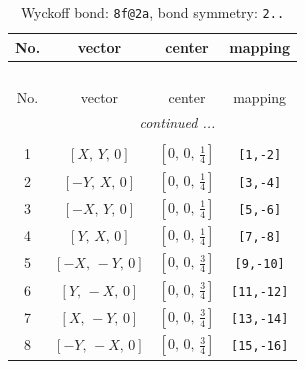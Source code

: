 \documentclass[fleqn,8pt]{jsarticle}
\begin{document}
\begin{longtable}{cccc}
\caption{Wyckoff bond: {\tt 8f@2a}, bond symmetry: {\tt 2..}}
 \\
 \hline \hline
No. & vector & center & mapping \\ \hline \endfirsthead

\multicolumn{3}{l}{\tablename\ \thetable{}} \\
 \hline \hline
No. & vector & center & mapping \\ \hline \endhead

 \hline \hline
\multicolumn{3}{r}{\footnotesize\it continued ...} \\ \endfoot

 \hline \hline
\multicolumn{3}{r}{} \\ \endlastfoot

1 & $\left[ X,\, Y,\, 0 \right]$ & $\left[ 0,\, 0,\, \frac{1}{4} \right]$ & {\tt [1,-2]} \\ \hline
2 & $\left[ - Y,\, X,\, 0 \right]$ & $\left[ 0,\, 0,\, \frac{1}{4} \right]$ & {\tt [3,-4]} \\ \hline
3 & $\left[ - X,\, Y,\, 0 \right]$ & $\left[ 0,\, 0,\, \frac{1}{4} \right]$ & {\tt [5,-6]} \\ \hline
4 & $\left[ Y,\, X,\, 0 \right]$ & $\left[ 0,\, 0,\, \frac{1}{4} \right]$ & {\tt [7,-8]} \\ \hline
5 & $\left[ - X,\, - Y,\, 0 \right]$ & $\left[ 0,\, 0,\, \frac{3}{4} \right]$ & {\tt [9,-10]} \\ \hline
6 & $\left[ Y,\, - X,\, 0 \right]$ & $\left[ 0,\, 0,\, \frac{3}{4} \right]$ & {\tt [11,-12]} \\ \hline
7 & $\left[ X,\, - Y,\, 0 \right]$ & $\left[ 0,\, 0,\, \frac{3}{4} \right]$ & {\tt [13,-14]} \\ \hline
8 & $\left[ - Y,\, - X,\, 0 \right]$ & $\left[ 0,\, 0,\, \frac{3}{4} \right]$ & {\tt [15,-16]} \\
\end{longtable}
\renewcommand{\arraystretch}{1.2}
\end{document}

